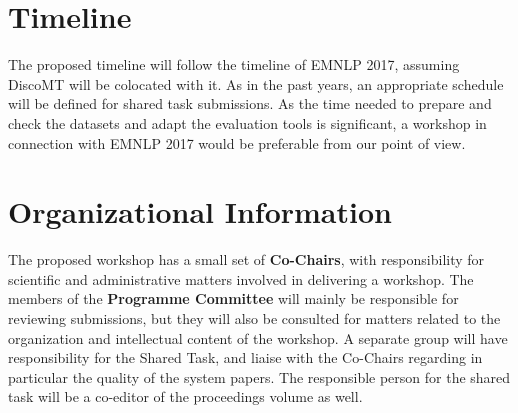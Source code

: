 \documentclass[11pt]{article}
\begin{document}
\section{Timeline}

The proposed timeline will follow the timeline of EMNLP 2017, assuming DiscoMT will be colocated with it.  As in the past years, an appropriate schedule will be defined for shared task submissions.  As the time needed to prepare and check the datasets and adapt the evaluation
tools is significant, a workshop in connection with EMNLP 2017 would be preferable from our point of view.

\section{Organizational Information}

The proposed workshop has a small set of \textbf{Co-Chairs}, with responsibility
for scientific and administrative matters involved in delivering a workshop.  The members of 
the \textbf{Programme Committee} will mainly be responsible for reviewing submissions, but 
they will also be consulted for matters related to the organization and
intellectual content of the workshop.  A separate group will have responsibility for the Shared Task,
and liaise with the Co-Chairs regarding in particular the quality of the system papers.  The responsible
person for the shared task will be a co-editor of the proceedings volume as well.

\medskip
\end{document}
